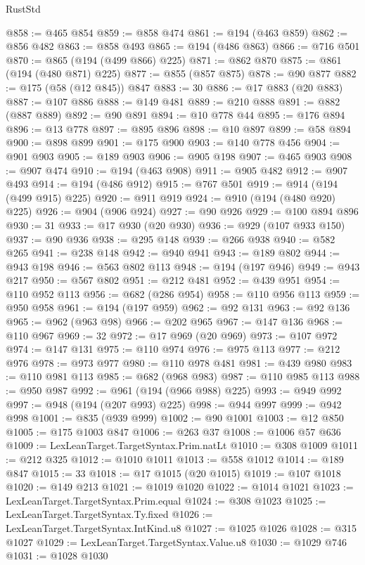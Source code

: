 \begin{lexlean}{RustStd}
\begin{coremodule}
{\begin{coremodule}
{{{{{{{{{{{{{{{{{{{{{{{{{{{{{{{{{{{{{{{{{{{{{@858 := @465 @854
@859 := @858 @474
@861 := @194 (@463 @859)
@862 := @856 @482
@863 := @858 @493
@865 := @194 (@486 @863)
@866 := @716 @501
@870 := @865 (@194 (@499 @866) @225)
@871 := @862 @870
@875 := @861 (@194 (@480 @871) @225)
@877 := @855 (@857 @875)
@878 := @90 @877
@882 := @175 (@58 (@12 @845)) @847
@883 := 30
@886 := @17 @883 (@20 @883)
@887 := @107 @886
@888 := @149 @481
@889 := @210 @888
@891 := @882 (@887 @889)
@892 := @90 @891
@894 := @10 @778 @44
@895 := @176 @894
@896 := @13 @778
@897 := @895 @896
@898 := @10 @897
@899 := @58 @894
@900 := @898 @899
@901 := @175 @900
@903 := @140 @778 @456
@904 := @901 @903
@905 := @189 @903
@906 := @905 @198
@907 := @465 @903
@908 := @907 @474
@910 := @194 (@463 @908)
@911 := @905 @482
@912 := @907 @493
@914 := @194 (@486 @912)
@915 := @767 @501
@919 := @914 (@194 (@499 @915) @225)
@920 := @911 @919
@924 := @910 (@194 (@480 @920) @225)
@926 := @904 (@906 @924)
@927 := @90 @926
@929 := @100 @894 @896
@930 := 31
@933 := @17 @930 (@20 @930)
@936 := @929 (@107 @933 @150)
@937 := @90 @936
@938 := @295 @148
@939 := @266 @938
@940 := @582 @265
@941 := @238 @148
@942 := @940 @941
@943 := @189 @802
@944 := @943 @198
@946 := @563 @802 @113
@948 := @194 (@197 @946)
@949 := @943 @217
@950 := @567 @802
@951 := @212 @481
@952 := @439 @951
@954 := @110 @952 @113
@956 := @682 (@286 @954)
@958 := @110 @956 @113
@959 := @950 @958
@961 := @194 (@197 @959)
@962 := @92 @131
@963 := @92 @136
@965 := @962 (@963 @98)
@966 := @202 @965
@967 := @147 @136
@968 := @110 @967
@969 := 32
@972 := @17 @969 (@20 @969)
@973 := @107 @972
@974 := @147 @131
@975 := @110 @974
@976 := @975 @113
@977 := @212 @976
@978 := @973 @977
@980 := @110 @978 @481
@981 := @439 @980
@983 := @110 @981 @113
@985 := @682 (@968 @983)
@987 := @110 @985 @113
@988 := @950 @987
@992 := @961 (@194 (@966 @988) @225)
@993 := @949 @992
@997 := @948 (@194 (@207 @993) @225)
@998 := @944 @997
@999 := @942 @998
@1001 := @835 (@939 @999)
@1002 := @90 @1001
@1003 := @12 @850
@1005 := @175 @1003 @847
@1006 := @263 @37
@1008 := @1006 @57 @636
@1009 := LexLeanTarget.TargetSyntax.Prim.natLt
@1010 := @308 @1009
@1011 := @212 @325
@1012 := @1010 @1011
@1013 := @558 @1012
@1014 := @189 @847
@1015 := 33
@1018 := @17 @1015 (@20 @1015)
@1019 := @107 @1018
@1020 := @149 @213
@1021 := @1019 @1020
@1022 := @1014 @1021
@1023 := LexLeanTarget.TargetSyntax.Prim.equal
@1024 := @308 @1023
@1025 := LexLeanTarget.TargetSyntax.Ty.fixed
@1026 := LexLeanTarget.TargetSyntax.IntKind.u8
@1027 := @1025 @1026
@1028 := @315 @1027
@1029 := LexLeanTarget.TargetSyntax.Value.u8
@1030 := @1029 @746
@1031 := @1028 @1030
}}}}}}}}}}}}}}}}}}}}}}}}}}}}}}}}}}}}}}}}}}}}}
\end{coremodule}}
\end{coremodule}
\end{lexlean}

